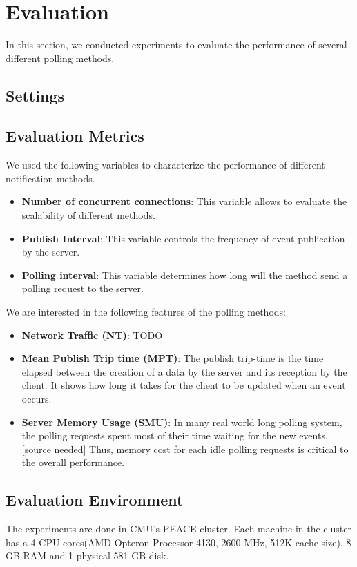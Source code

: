 \section {Evaluation\\}

In this section, we conducted experiments to evaluate the performance of several different polling methods.

\subsection{Settings \\}

\subsection{Evaluation Metrics \\}
We used the following variables to characterize the performance of different notification methods.
\begin{itemize}
    \item {\bf Number of concurrent connections}: This variable allows to evaluate the scalability of different methods.
    \item {\bf Publish Interval}: This variable controls the frequency of event publication by the server. 
    \item {\bf Polling interval}: This variable determines how long will the method send a polling request to the server.
\end{itemize}

We are interested in the following features of the polling methods:
\begin{itemize}
    \item {\bf Network Traffic (NT)}: TODO
    \item {\bf Mean Publish Trip time (MPT)}: The publish trip-time is the time elapsed between the creation of a data by the server and its reception by the client.
    It shows how long it takes for the client to be updated when an event occurs.
    \item {\bf Server Memory Usage (SMU)}: In many real world long polling system, the polling requests spent most of their time waiting for the new events.[source needed] 
        Thus, memory cost for each idle polling requests is critical to the overall performance.
\end{itemize}

\subsection{Evaluation Environment \\}
The experiments are done in CMU's PEACE cluster. Each machine in the cluster has a 4 CPU cores(AMD Opteron Processor 4130, 2600 MHz, 512K cache size), 8 GB RAM and 1 physical 581 GB disk.

